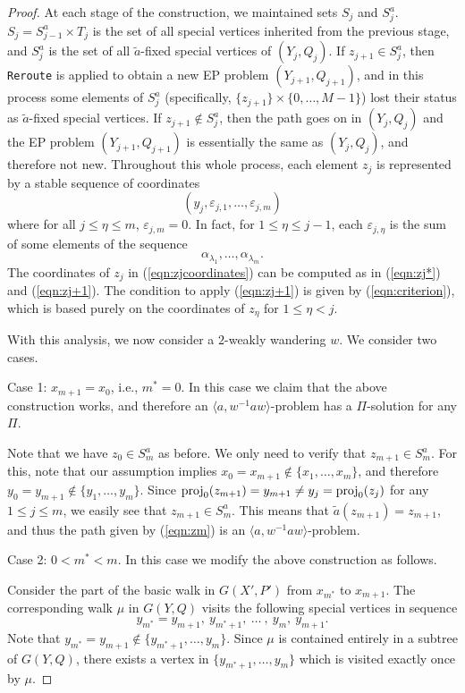 \documentclass[11pt]{amsart}
\theoremstyle{definition}
\theoremstyle{definition}
\numberwithin{equation}{section}
\begin{document}
\begin{proof}
At each stage of the construction, we maintained sets $S_j$ and $S_j^a$. $S_j=S^a_{j-1}\times T_j$ is the set of all special vertices inherited from the previous stage, and $S_j^a$ is the set of all $\tilde{a}$-fixed special vertices of $(Y_j, Q_j)$. If $z_{j+1}\in S_j^a$, then {\tt Reroute} is applied to obtain a new EP problem $(Y_{j+1}, Q_{j+1})$, and in this process some elements of $S_j^a$ (specifically, $\{z_{j+1}\}\times \{0, \dots, M-1\}$) lost their status as $\tilde{a}$-fixed special vertices. If $z_{j+1}\not\in S_j^a$, then the path goes on in $(Y_j, Q_j)$ and the EP problem $(Y_{j+1}, Q_{j+1})$ is essentially the same as $(Y_j, Q_j)$, and therefore not new. Throughout this whole process, each element $z_j$ is represented by a stable sequence of coordinates
\begin{equation}\label{eqn:zjcoordinates} (y_j, \varepsilon_{j,1}, \dots, \varepsilon_{j, m}) \end{equation}
where for all $j\leq \eta\leq m$, $\varepsilon_{j, m}=0$. In fact, for $1\leq \eta\leq j-1$, each $\varepsilon_{j, \eta}$ is the sum of some elements of the sequence
$$ \alpha_{\lambda_1}, \dots, \alpha_{\lambda_m}. $$
The coordinates of $z_j$ in (\ref{eqn:zjcoordinates}) can be computed as in (\ref{eqn:zj*}) and (\ref{eqn:zj+1}). The condition to apply (\ref{eqn:zj+1}) is given by (\ref{eqn:criterion}), which is based purely on the coordinates of $z_\eta$ for $1\leq \eta<j$.

With this analysis, we now consider a $2$-weakly wandering $w$. We consider two cases.

Case 1: $x_{m+1}=x_0$, i.e., $m^*=0$. In this case we claim that the above construction works, and therefore an $\langle a, w^{-1}aw\rangle$-problem has a $\Pi$-solution for any $\Pi$. 

Note that we have $z_0\in S_m^a$ as before. We only need to verify that $z_{m+1}\in S_m^a$. For this, note that our assumption implies $x_0=x_{m+1}\not\in\{x_1, \dots, x_m\}$, and therefore $y_0=y_{m+1}\not\in \{y_1, \dots, y_m\}$. Since $\mbox{\rm proj}_0(z_{m+1})=y_{m+1}\neq y_j=\mbox{\rm proj}_0(z_j)$ for any $1\leq j\leq m$, we easily see that $z_{m+1}\in S_m^a$. This means that $\tilde{a}(z_{m+1})=z_{m+1}$, and thus the path given by (\ref{eqn:zm}) is an $\langle a, w^{-1}aw\rangle$-problem.

Case 2: $0<m^*<m$. In this case we modify the above construction as follows. 

Consider the part of the basic walk in $G(X', P')$ from $x_{m^*}$ to $x_{m+1}$. The corresponding walk $\mu$ in $G(Y, Q)$ visits the following special vertices in sequence
$$ y_{m^*}=y_{m+1}, \  y_{m^*+1}, \  \dots\ , \ y_m, \ y_{m+1}. $$
Note that $y_{m^*}=y_{m+1}\not\in \{y_{m^*+1},\dots, y_m\}$. Since $\mu$ is contained entirely in a subtree of $G(Y, Q)$, there exists a vertex in $\{y_{m^*+1},\dots, y_m\}$ which is visited exactly once by $\mu$. 


\end{proof}
\end{document}

